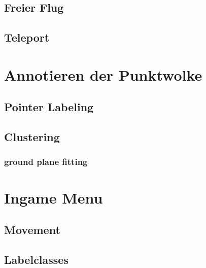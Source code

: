 \subsection{Freier Flug}
\subsection{Teleport}

\section{Annotieren der Punktwolke}
\label{sec:Annotation}
\subsection{Pointer Labeling}
\subsection{Clustering}
\subsubsection{ground plane fitting}

\section{Ingame Menu}
\label{sec:UIMenu}
\subsection{Movement}
\subsection{Labelclasses}



